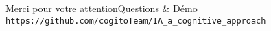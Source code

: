 \begin{frame}{Merci pour votre attention}{Questions \& Démo}
\texttt{https://github.com/cogitoTeam/IA\_a\_cognitive\_approach}

\end{frame}